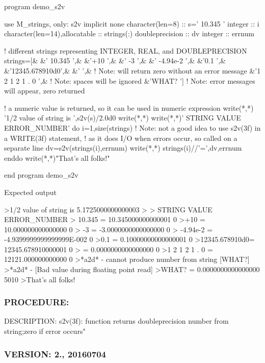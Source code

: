 \begin{DoxyVerb}program demo_s2v

 use M_strings, only: s2v
 implicit none
 character(len=8)              :: s=' 10.345 '
 integer                       :: i
 character(len=14),allocatable :: strings(:)
 doubleprecision               :: dv
 integer                       :: errnum

 ! different strings representing INTEGER, REAL, and DOUBLEPRECISION
 strings=[&
 &' 10.345       ',&
 &'+10           ',&
 &'    -3        ',&
 &'    -4.94e-2  ',&
 &'0.1           ',&
 &'12345.678910d0',&
 &'              ',& ! Note: will return zero without an error message
 &'1 2 1 2 1 . 0 ',& ! Note: spaces will be ignored
 &'WHAT?         ']  ! Note: error messages will appear, zero returned

 ! a numeric value is returned, so it can be used in numeric expression
 write(*,*) '1/2 value of string is ',s2v(s)/2.0d0
 write(*,*)
 write(*,*)' STRING            VALUE                    ERROR_NUMBER'
 do i=1,size(strings)
    ! Note: not a good idea to use s2v(3f) in a WRITE(3f) statement,
    ! as it does I/O when errors occur, so called on a separate line
    dv=s2v(strings(i),errnum)
    write(*,*) strings(i)//'=',dv,errnum
 enddo
 write(*,*)"That's all folks!"

 end program demo_s2v

Expected output

 >1/2 value of string is    5.1725000000000003
 >
 > STRING            VALUE                    ERROR_NUMBER
 > 10.345       =   10.345000000000001                0
 >+10           =   10.000000000000000                0
 >    -3        =  -3.0000000000000000                0
 >    -4.94e-2  =  -4.9399999999999999E-002           0
 >0.1           =  0.10000000000000001                0
 >12345.678910d0=   12345.678910000001                0
 >              =   0.0000000000000000                0
 >1 2 1 2 1 . 0 =   12121.000000000000                0
 >*a2d* - cannot produce number from string [WHAT?]
 >*a2d* - [Bad value during floating point read]
 >WHAT?         =   0.0000000000000000             5010
 >That's all folks! \end{DoxyVerb}


\subsubsection*{P\+R\+O\+C\+E\+D\+U\+RE\+:}

D\+E\+S\+C\+R\+I\+P\+T\+I\+ON\+: s2v(3f)\+: function returns doubleprecision number from string;zero if error occurs" \subsubsection*{V\+E\+R\+S\+I\+ON\+: 2., 20160704}

